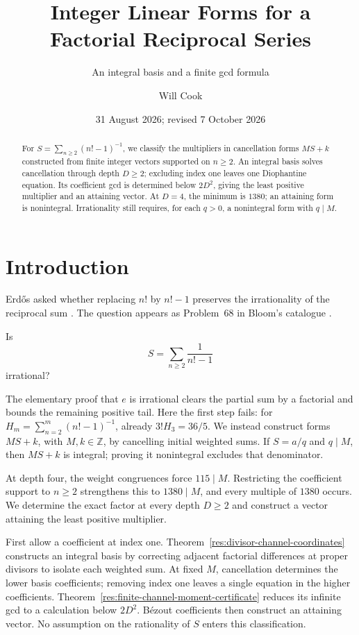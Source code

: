\documentclass[11pt]{article}
\title{Integer Linear Forms for a\\Factorial Reciprocal Series}
\subtitle{An integral basis and a finite gcd formula}
\author{Will Cook}
\date{31 August 2026; revised 7 October 2026}
\newcommand{\Ser}{S}
\begin{document}
\maketitle
\noteprovenance

\begin{abstract}
For $S=\sum_{n\ge2}(n!-1)^{-1}$, we classify the multipliers in
cancellation forms $MS+k$ constructed from finite integer vectors
supported on $n\ge2$. An integral basis solves cancellation through
depth $D\ge2$; excluding index one leaves one Diophantine equation.
Its coefficient gcd is
determined below $2D^2$, giving the least positive multiplier and an
attaining vector. At $D=4$, the minimum is $1380$; an attaining form
is nonintegral. Irrationality still requires, for each $q>0$, a
nonintegral form with $q\mid M$.
\end{abstract}

\section{Introduction}\label{sec:problem}

Erd\H{o}s asked whether replacing $n!$ by $n!-1$ preserves the irrationality
of the reciprocal sum \cite[p.~102]{erdos1988}. The question appears as
Problem~68 in Bloom's catalogue \cite{bloom}.

\begin{problem}\label{res:problem}
Is
\[
  \Ser=\sum_{n\ge2}\frac1{n!-1}
\]
irrational?
\end{problem}

The elementary proof that $e$ is irrational clears the partial sum
by a factorial and bounds the remaining positive tail. Here the first
step fails: for $H_m=\sum_{n=2}^m(n!-1)^{-1}$, already
$3!H_3=36/5$. We instead construct forms $MS+k$, with $M,k\in\mathbb Z$,
by cancelling initial weighted sums. If $S=a/q$ and $q\mid M$, then
$MS+k$ is integral; proving it nonintegral excludes that denominator.

At depth four, the weight congruences force $115\mid M$. Restricting
the coefficient support to $n\ge2$ strengthens this to $1380\mid M$,
and every multiple of $1380$ occurs. We determine the exact factor at
every depth $D\ge2$ and construct a vector attaining the least
positive multiplier.

First allow a coefficient at index one.
Theorem~\ref{res:divisor-channel-coordinates} constructs an integral
basis by correcting adjacent factorial differences at proper divisors
to isolate each weighted sum.
At fixed $M$, cancellation determines the lower basis coefficients;
removing index one leaves a single equation in the higher coefficients.
Theorem~\ref{res:finite-channel-moment-certificate} reduces its infinite
gcd to a calculation below $2D^2$. B\'ezout coefficients then construct
an attaining vector. No assumption on the rationality of $S$ enters
this classification.
\end{document}
